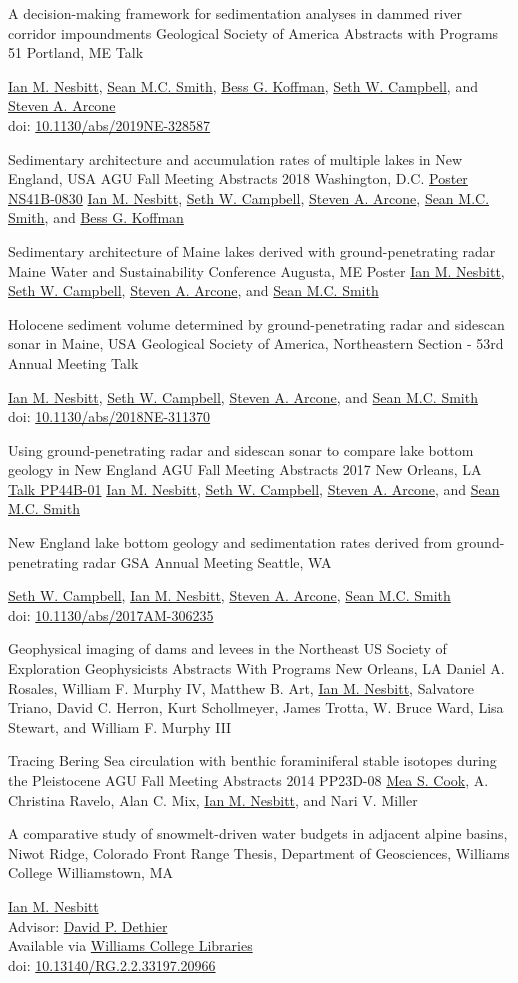 \documentclass[a4paper,12pt,sans,colorlinks]{moderncv}
\newcommand{\me}{\href{https://www.iannesbitt.org}{Ian M. Nesbitt}}
\newcommand{\seth}{\href{https://www.alpinesciences.net}{Seth W. Campbell}}
\newcommand{\sean}{\href{https://umaine.edu/earthclimate/people/sean-m-c-smith/}{Sean M.C. Smith}}
\newcommand{\bess}{\href{https://www.colby.edu/directory/profile/bess.koffman/}{Bess G. Koffman}}
\newcommand{\stevearcone}{\href{https://engineering.dartmouth.edu/community/faculty/steven-arcone}{Steven A. Arcone}}
\newcommand{\mea}{\href{https://geosciences.williams.edu/profile/msc1/}{Mea S. Cook}}
\newcommand{\david}{\href{https://geosciences.williams.edu/profile/ddethier/}{David P. Dethier}}
\newcommand{\agunola}{\href{https://agu.confex.com/agu/fm17/meetingapp.cgi/Paper/260265}{Talk PP44B-01}}
\newcommand{\agudc}{\href{https://agu.confex.com/agu/fm18/meetingapp.cgi/Paper/449070}{Poster NS41B-0830}}
\newcommand{\williamsthesis}{\href{https://unbound.williams.edu/theses/islandora/object/studenttheses:766}{Williams College Libraries}}
\newcommand{\doi}[1]{%
    \href{https://doi.org/#1}{#1}
}
\begin{document}
{A decision-making framework for sedimentation analyses in
dammed river corridor impoundments}
{Geological Society of America Abstracts with Programs 51}
{Portland, ME}
{Talk}
{
    \me{}, \sean{}, \bess{}, \seth{}, and \stevearcone{}
    \\
    doi: \doi{10.1130/abs/2019NE-328587}
}

{Sedimentary architecture and accumulation rates of
multiple lakes in New England, USA}
{AGU Fall Meeting Abstracts 2018}
{Washington, D.C.}
{\agudc}
{
    \me{}, \seth{}, \stevearcone{}, \sean{}, and \bess{}
}

{Sedimentary architecture of Maine lakes derived
with ground-penetrating radar}
{Maine Water and Sustainability Conference}
{Augusta, ME}
{Poster}
{
    \me{}, \seth{}, \stevearcone{}, and \sean{}
}

{Holocene sediment volume determined by
ground-penetrating radar and sidescan sonar in Maine, USA}
{Geological Society of America, Northeastern Section - 53rd Annual Meeting}
{}
{Talk}
{
    \me{}, \seth{}, \stevearcone{}, and \sean{}
    \\
    doi: \doi{10.1130/abs/2018NE-311370}
}

{Using ground-penetrating radar and sidescan sonar to
compare lake bottom geology in New England}
{AGU Fall Meeting Abstracts 2017}
{New Orleans, LA}
{\agunola}
{
    \me{}, \seth{}, \stevearcone{}, and \sean{}
}

{New England lake bottom geology and sedimentation
rates derived from ground-penetrating radar}
{GSA Annual Meeting}
{Seattle, WA}
{}
{
    \seth{}, \me{}, \stevearcone{}, \sean{}
    \\
    doi: \doi{10.1130/abs/2017AM-306235}
}

{Geophysical imaging of dams and levees in the Northeast US}
{Society of Exploration Geophysicists Abstracts With Programs}
{New Orleans, LA}
{}
{Daniel A. Rosales, William F. Murphy IV, Matthew B. Art,
\me, Salvatore Triano, David C. Herron, Kurt Schollmeyer,
James Trotta, W. Bruce Ward, Lisa Stewart, and William F.
Murphy III}

{Tracing Bering Sea circulation with benthic
foraminiferal stable isotopes during the Pleistocene}
{AGU Fall Meeting Abstracts 2014}
{}
{PP23D-08}
{
    \mea{}, A. Christina Ravelo, Alan C. Mix, \me{},
    and Nari V. Miller
}

{A comparative study of snowmelt-driven water budgets in
adjacent alpine basins, Niwot Ridge, Colorado Front Range}
{Thesis, Department of Geosciences, Williams College}
{Williamstown, MA}
{}
{
    \me{}
    \\
    Advisor: \david
    \\
    Available via \williamsthesis
    \\
    doi: \doi{10.13140/RG.2.2.33197.20966}
}
\end{document}
